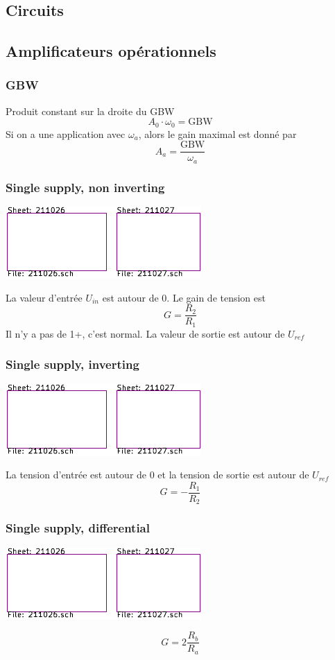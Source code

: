 \documentclass[]{article}
\begin{document}
\begin{multicols}{3}
\section{Circuits}
\subsection{Amplificateurs opérationnels}
\subsubsection{GBW}
Produit constant sur la droite du GBW
$$A_0\cdot \omega_0 = \text{GBW}$$
Si on a une application avec $\omega_a$, alors le gain maximal est donné par
$$A_a=\frac{\text{GBW}}{\omega_a}$$
\subsubsection{Single supply, non inverting}
\begin{center}
\includegraphics[width=0.7\columnwidth,page=3]{../KiCad/resume-crop.pdf}
\end{center}
La valeur d'entrée $U_{in}$ est autour de 0. Le gain de tension est
$$G=\frac{R_2}{R_1}$$
Il n'y a pas de 1+, c'est normal. La valeur de sortie est autour de $U_{ref}$
\subsubsection{Single supply, inverting}
\begin{center}
\includegraphics[width=0.7\columnwidth,page=4]{../KiCad/resume-crop.pdf}
\end{center}
La tension d'entrée est autour de 0 et la tension de sortie est autour de $U_{ref}$
$$G=-\frac{R_1}{R_2}$$
\subsubsection{Single supply, differential}
\begin{center}
\includegraphics[width=0.7\columnwidth,page=5]{../KiCad/resume-crop.pdf}
\end{center}
$$G=2\frac{R_b}{R_a}$$


\end{multicols}
\end{document}
